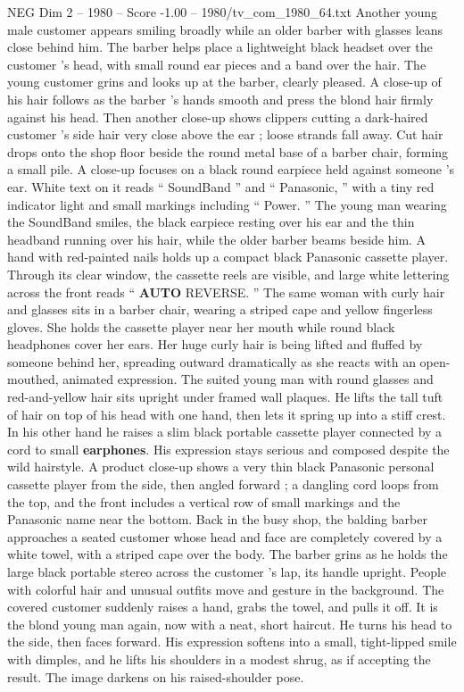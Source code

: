 \begin{textsample}{NEG Dim 2 – 1980 – Score -1.00 – 1980/tv\_com\_1980\_64.txt}
Another young male customer appears smiling broadly while an older barber with glasses leans close behind him.
The barber helps place a lightweight black headset over the customer ’s head, with small round ear pieces and a band over the hair.
The young customer grins and looks up at the barber, clearly pleased.
A close-up of his hair follows as the barber ’s hands smooth and press the blond hair firmly against his head.
Then another close-up shows clippers cutting a dark-haired customer ’s side hair very close above the ear ; loose strands fall away.
Cut hair drops onto the shop floor beside the round metal base of a barber chair, forming a small pile.
A close-up focuses on a black round earpiece held against someone ’s ear.
White text on it reads “ SoundBand ” and “ Panasonic, ” with a tiny red indicator light and small markings including “ Power. ” The young man wearing the SoundBand smiles, the black earpiece resting over his ear and the thin headband running over his hair, while the older barber beams beside him.
A hand with red-painted nails holds up a compact black Panasonic cassette player.
Through its clear window, the cassette reels are visible, and large white lettering across the front reads “ \textbf{AUTO} REVERSE. ” The same woman with curly hair and glasses sits in a barber chair, wearing a striped cape and yellow fingerless gloves.
She holds the cassette player near her mouth while round black headphones cover her ears.
Her huge curly hair is being lifted and fluffed by someone behind her, spreading outward dramatically as she reacts with an open-mouthed, animated expression.
The suited young man with round glasses and red-and-yellow hair sits upright under framed wall plaques.
He lifts the tall tuft of hair on top of his head with one hand, then lets it spring up into a stiff crest.
In his other hand he raises a slim black portable cassette player connected by a cord to small \textbf{earphones}.
His expression stays serious and composed despite the wild hairstyle.
A product close-up shows a very thin black Panasonic personal cassette player from the side, then angled forward ; a dangling cord loops from the top, and the front includes a vertical row of small markings and the Panasonic name near the bottom.
Back in the busy shop, the balding barber approaches a seated customer whose head and face are completely covered by a white towel, with a striped cape over the body.
The barber grins as he holds the large black portable stereo across the customer ’s lap, its handle upright.
People with colorful hair and unusual outfits move and gesture in the background.
The covered customer suddenly raises a hand, grabs the towel, and pulls it off.
It is the blond young man again, now with a neat, short haircut.
He turns his head to the side, then faces forward.
His expression softens into a small, tight-lipped smile with dimples, and he lifts his shoulders in a modest shrug, as if accepting the result.
The image darkens on his raised-shoulder pose.

\end{textsample}
